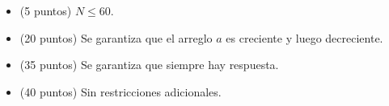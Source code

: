 \documentclass[12pt]{scrartcl}
\begin{document}


    \begin{itemize}
        \item (5 puntos) $N \le 60$.
        \item (20 puntos) Se garantiza que el arreglo $a$ es creciente y luego decreciente.
        \item (35 puntos) Se garantiza que siempre hay respuesta.
        \item (40 puntos) Sin restricciones adicionales.
    \end{itemize}
\end{document}
